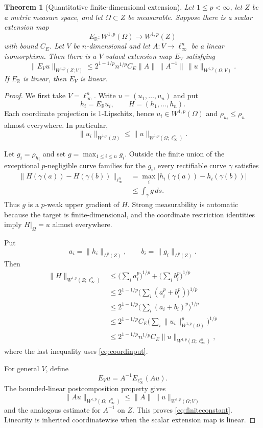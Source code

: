 \documentclass[11pt]{article}
\newtheorem{theorem}{Theorem}[section]
\theoremstyle{remark}
\newcommand{\R}{\mathbb{R}}
\newcommand{\Om}{\Omega}
\newcommand{\Lp}{L^p}
\newcommand{\Wp}{W^{1,p}}
\newcommand{\rhoMin}[1]{\rho_{#1}}
\newcommand{\restr}[2]{#1\vert_{#2}}
\begin{document}
\begin{theorem}[Quantitative finite-dimensional extension]
\label{thm:finite}
Let $1\le p<\infty$, let $Z$ be a metric measure space, and let
$\Om\subset Z$ be measurable.  Suppose there is a scalar extension map
\[
  E_{\R}:\Wp(\Om)\longrightarrow \Wp(Z)
\]
with bound $C_E$.  Let $V$ be $n$-dimensional and let
$A:V\to\ell_\infty^n$ be a linear isomorphism.  Then there is a $V$-valued
extension map $E_V$ satisfying
\begin{equation}
\label{eq:finiteconstant}
  \|E_Vu\|_{\Wp(Z;V)}
  \le 2^{1-1/p} n^{1/p} C_E
       \|A\|\,\|A^{-1}\|\,
       \|u\|_{\Wp(\Om;V)}.
\end{equation}
If $E_{\R}$ is linear, then $E_V$ is linear.
\end{theorem}

\begin{proof}
We first take $V=\ell_\infty^n$.  Write
$u=(u_1,\dots,u_n)$ and put
\[
  h_i=E_{\R}u_i,
  \qquad
  H=(h_1,\dots,h_n).
\]
Each coordinate projection is $1$-Lipschitz, hence
$u_i\in\Wp(\Om)$ and $\rhoMin{u_i}\le\rhoMin{u}$ almost everywhere.  In
particular,
\begin{equation}
\label{eq:coordinput}
  \|u_i\|_{\Wp(\Om)}
  \le \|u\|_{\Wp(\Om;\ell_\infty^n)}.
\end{equation}

Let $g_i=\rhoMin{h_i}$ and set $g=\max_{1\le i\le n}g_i$.  Outside the finite
union of the exceptional $p$-negligible curve families for the $g_i$, every
rectifiable curve $\gamma$ satisfies
\[
 \begin{split}
  \|H(\gamma(a))-H(\gamma(b))\|_{\ell_\infty^n}
  &=\max_i |h_i(\gamma(a))-h_i(\gamma(b))|\\
  &\le \int_\gamma g\,ds.
 \end{split}
\]
Thus $g$ is a $p$-weak upper gradient of $H$.  Strong measurability is
automatic because the target is finite-dimensional, and the coordinate
restriction identities imply $\restr{H}{\Om}=u$ almost everywhere.

Put
\[
  a_i=\|h_i\|_{\Lp(Z)},
  \qquad b_i=\|g_i\|_{\Lp(Z)}.
\]
Then
\[
 \begin{split}
  \|H\|_{\Wp(Z;\ell_\infty^n)}
  &\le \Big(\sum_i a_i^p\Big)^{1/p}
       +\Big(\sum_i b_i^p\Big)^{1/p}\\
  &\le 2^{1-1/p}
       \Big(\sum_i(a_i^p+b_i^p)\Big)^{1/p}\\
  &\le 2^{1-1/p}
       \Big(\sum_i(a_i+b_i)^p\Big)^{1/p}\\
  &\le 2^{1-1/p}C_E
       \Big(\sum_i\|u_i\|_{\Wp(\Om)}^p\Big)^{1/p}\\
  &\le 2^{1-1/p}n^{1/p}C_E
       \|u\|_{\Wp(\Om;\ell_\infty^n)},
 \end{split}
\]
where the last inequality uses \eqref{eq:coordinput}.

For general $V$, define
\[
  E_Vu=A^{-1}E_{\ell_\infty^n}(Au).
\]
The bounded-linear postcomposition property gives
\[
  \|Au\|_{\Wp(\Om;\ell_\infty^n)}
  \le \|A\|\,\|u\|_{\Wp(\Om;V)}
\]
and the analogous estimate for $A^{-1}$ on $Z$.  This proves
\eqref{eq:finiteconstant}.  Linearity is inherited coordinatewise when the
scalar extension map is linear.
\end{proof}
\end{document}
